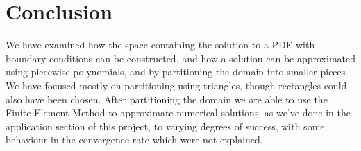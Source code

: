\chapter{Conclusion}
We have examined how the space containing the solution to a PDE 
with boundary conditions can be constructed, and how a solution can be 
approximated using piecewise polynomials, and by partitioning the domain 
into smaller pieces.
We have focused mostly on partitioning using triangles, though rectangles could 
also have been chosen.
After partitioning the domain we are able to use the Finite Element Method to approximate numerical solutions, 
as we've done in the application section of this project, to 
varying degrees of success, with some behaviour in the convergence rate which were 
not explained.